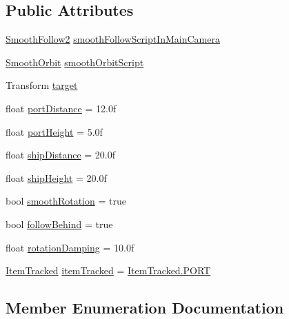 \subsection*{Public Attributes}
\begin{DoxyCompactItemize}
\item 
\hyperlink{class_smooth_follow2}{Smooth\+Follow2} \hyperlink{class_planetary_camera_smooth_follow_aef1441de46c18ff488afa21fa207dc12}{smooth\+Follow\+Script\+In\+Main\+Camera}
\item 
\hyperlink{class_smooth_orbit}{Smooth\+Orbit} \hyperlink{class_planetary_camera_smooth_follow_a25f9a9fa0f51bd1fb3b794cc4029a67e}{smooth\+Orbit\+Script}
\item 
Transform \hyperlink{class_planetary_camera_smooth_follow_ad761466f05019f8e678004773322a31e}{target}
\item 
float \hyperlink{class_planetary_camera_smooth_follow_ac02cf6fbd835ef29235494ee7962b910}{port\+Distance} = 12.\+0f
\item 
float \hyperlink{class_planetary_camera_smooth_follow_aa0187688de82f0be79b78c4e1021e01f}{port\+Height} = 5.\+0f
\item 
float \hyperlink{class_planetary_camera_smooth_follow_a0fa1bed95199f9ad8b79168ac0b3981b}{ship\+Distance} = 20.\+0f
\item 
float \hyperlink{class_planetary_camera_smooth_follow_a7b1c263e1c691c6525891b955ca263d7}{ship\+Height} = 20.\+0f
\item 
bool \hyperlink{class_planetary_camera_smooth_follow_ad8e7f74b3a8fa5ddad015dba2000c3c7}{smooth\+Rotation} = true
\item 
bool \hyperlink{class_planetary_camera_smooth_follow_a2ada69b1be10fe9a1db36920c43c23bd}{follow\+Behind} = true
\item 
float \hyperlink{class_planetary_camera_smooth_follow_a0522edf96c6229ceb04f64e0d88e0477}{rotation\+Damping} = 10.\+0f
\item 
\hyperlink{class_planetary_camera_smooth_follow_afa0d6f2c2eeb983407f6c0594abd2e20}{Item\+Tracked} \hyperlink{class_planetary_camera_smooth_follow_a7a231a459b30214cb78b775b21f7b1d5}{item\+Tracked} = \hyperlink{class_planetary_camera_smooth_follow_afa0d6f2c2eeb983407f6c0594abd2e20a463c00141b4c3a7f76acd3540052f8f5}{Item\+Tracked.\+P\+O\+RT}
\end{DoxyCompactItemize}


\subsection{Member Enumeration Documentation}
